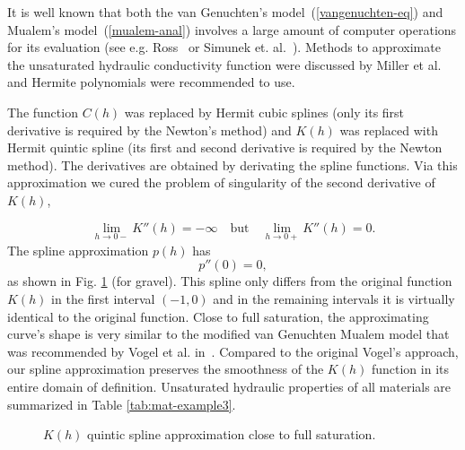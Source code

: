 \documentclass[final,3p,times,twocolumn]{elsarticle}
\begin{document}
It is well known  that
both the van Genuchten's model~(\ref{vangenuchten-eq}) and Mualem's model~(\ref{mualem-anal})
involves a large amount of computer operations for its evaluation (see e.g. Ross~\cite{ross} or Simunek et. al.~\cite{simunek}).
Methods to approximate the unsaturated hydraulic conductivity function were discussed by Miller et al.~\cite{miller}
and Hermite polynomials were recommended to use.

The function $C(h)$ was replaced by Hermit cubic splines (only its first derivative is required 
by the Newton's method) and $K(h)$ was replaced with Hermit quintic spline (its first and second derivative is required 
by the Newton method). The derivatives are obtained by derivating the spline functions.
Via this approximation we cured the problem of singularity of the second derivative 
of $K(h)$, 

$$
  \lim_{h \to 0-} K''(h) = -\infty \quad \mbox{but} \quad \lim_{h \to 0+} K''(h) = 0. 
$$ 
The spline approximation $p(h)$ has 
$$
  p''(0) = 0,
$$
as shown in Fig. \ref{fig:kh-approx} (for gravel).
This spline only differs from the original function $K(h)$ in the first interval 
$(-1, 0)$ and in the remaining intervals it is virtually identical to the 
original function. Close to full saturation, the approximating curve's shape is 
very similar to the modified van Genuchten Mualem model that was recommended by Vogel et al. 
in~\cite{vogel}. Compared to the original Vogel's approach, our spline approximation 
preserves the smoothness of the $K(h)$ function in its entire domain of definition.
Unsaturated hydraulic properties of all materials are summarized in Table \ref{tab:mat-example3}.

\begin{figure}[htb!]
    \begin{center} 
    \end{center}
        \caption{$K(h)$ quintic spline approximation close to full saturation. }
      \label{fig:kh-approx}
\end{figure}
\end{document}
